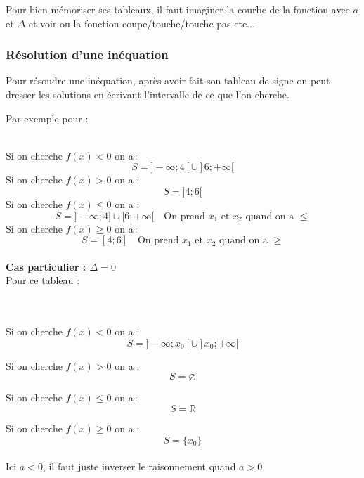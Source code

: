 \documentclass{article} %
\begin{document}
	Pour bien mémoriser ses tableaux, il faut imaginer la courbe de la fonction avec $a$ et $\Delta$ et voir ou la fonction coupe/touche/touche pas etc...
	
	\subsubsection{Résolution d'une inéquation}
	
	Pour résoudre une inéquation, après avoir fait son tableau de signe on peut dresser les solutions en écrivant l'intervalle de ce que l'on cherche.
	
	\noindent Par exemple pour :\\
	\\
	
	\noindent Si on cherche $f(x) < 0$ on a :
	\[
		S = ]-\infty;4[\cup]6;+\infty[
	\]
	\noindent Si on cherche $f(x) > 0$ on a :
	\[
	S = ]4;6[
	\]
	\noindent Si on cherche $f(x) \leq 0$ on a :
	\[
	S = ]-\infty;4]\cup[6;+\infty[ \quad \text{On prend $x_1$ et $x_2$ quand on a $\leq$}
	\]
	\noindent Si on cherche $f(x) \geq 0$ on a :
	\[
	S = [4;6] \quad \text{On prend $x_1$ et $x_2$ quand on a $\geq$}
	\]\\
	
	
	\textbf{Cas particulier : $\Delta = 0$}\\
	Pour ce tableau : \\\\
	\\
	
	\noindent Si on cherche $f(x) < 0$ on a :
	\[
	S = ]-\infty;x_0[ \cup ]x_0;+\infty[
	\]
	
	\noindent Si on cherche $f(x) > 0$ on a :
	\[
	S = \varnothing
	\]
	
	\noindent Si on cherche $f(x) \leq 0$ on a :
	\[
	S = \mathbb{R}
	\]
	
	\noindent Si on cherche $f(x) \geq 0$ on a :
	\[
	S = \{ x_0 \}
	\]\\
	
	\noindent Ici $a < 0$, il faut juste inverser le raisonnement quand $a > 0$.\\
	
\end{document}
